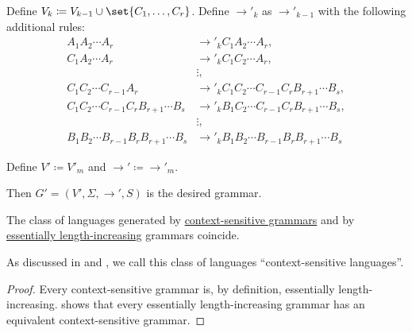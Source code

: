 \begin{algorithm}
\begin{thmenum}
    \begin{thmenum}
       Define \( V_k \coloneqq V_{k-1} \cup \set{ C_1, \ldots, C_r } \).
       Define \( \to'_k \) as \( \to'_{k-1} \) with the following additional rules:
      \begin{align*}
        A_1 A_2 \cdots A_r                            &\to'_k C_1 A_2 \cdots A_r, \\
        C_1 A_2 \cdots A_r                            &\to'_k C_1 C_2 \cdots A_r, \\
                                                      &\vdots, \\
        C_1 C_2 \cdots C_{r-1} A_r                    &\to'_k C_1 C_2 \cdots C_{r-1} C_r B_{r+1} \cdots B_s, \\
        C_1 C_2 \cdots C_{r-1} C_r B_{r+1} \cdots B_s &\to'_k B_1 C_2 \cdots C_{r-1} C_r B_{r+1} \cdots B_s, \\
                                                      &\vdots, \\
        B_1 B_2 \cdots B_{r-1} B_r B_{r+1} \cdots B_s &\to'_k B_1 B_2 \cdots B_{r-1} B_r B_{r+1} \cdots B_s
      \end{align*}
    \end{thmenum}

     Define \( V' \coloneqq V'_m \) and \( {}\to'{} \coloneqq {}\to'_m{} \).

    Then \( G' = (V', \Sigma, \to', S) \) is the desired grammar.
  \end{thmenum}
\end{algorithm}

\begin{proposition}\label{thm:context_sensitive_languages}
  The class of languages generated by \hyperref[def:chomsky_hierarchy/context_sensitive]{context-sensitive grammars} and by \hyperref[def:length_increasing_grammar]{essentially length-increasing} grammars coincide.
\end{proposition}
\begin{comments}
  \item As discussed in  and , we call this class of languages \enquote{context-sensitive languages}.
\end{comments}
\begin{proof}
  Every context-sensitive grammar is, by definition, essentially length-increasing.  shows that every essentially length-increasing grammar has an equivalent context-sensitive grammar.
\end{proof}

